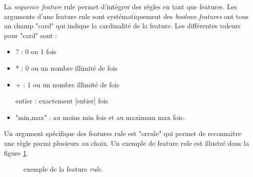 \documentclass[manual-fr.tex]{subfiles}
\begin{document}
La \textit{sequence feature} rule permet d'intégrer des règles en tant que features. Les arguments d'une feature rule sont systématiquement des \textit{boolean features} ont tous un champ "card" qui indique la cardinalité de la feature. Les différentes valeurs pour "card" sont :
\begin{itemize}
    \item ? : 0 ou 1 fois
    \item * : 0 ou un nombre illimité de fois
    \item + : 1 ou un nombre illimité de fois
    \item [entier] : exactement [entier] fois
    \item "min,max" : au moins min fois et au maximum max fois.
\end{itemize}

Un argument spécifique des features rule est "orrule" qui permet de reconnaitre une règle parmi plusieurs au choix. Un exemple de feature rule est illustré dans la figure \ref{fig:feature-rule}.

\begin{figure}[ht!]
\footnotesize
\begin{xml}
\end{xml}
\caption{exemple de la feature \textit{rule}.}
\label{fig:feature-rule}
\end{figure}
\end{document}
